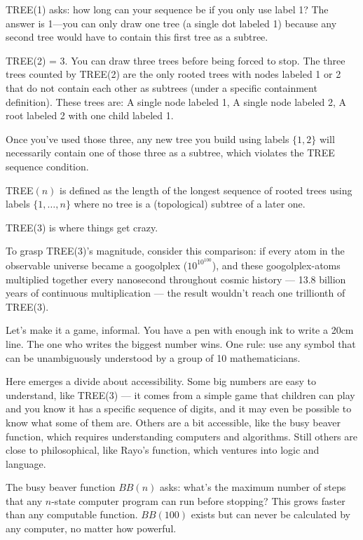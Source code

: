 TREE(1) asks: how long can your sequence be if you only use label 1? The answer is 1—you can only draw one tree (a single dot labeled 1) because any second tree would have to contain this first tree as a subtree.

TREE(2) = 3. You can draw three trees before being forced to stop. The three trees counted by TREE(2) are the only rooted trees with nodes labeled 1 or 2 that do not contain each other as subtrees (under a specific containment definition). These trees are: A single node labeled 1, A single node labeled 2, A root labeled 2 with one child labeled 1.

Once you've used those three, any new tree you build using labels $\{1, 2\}$ will necessarily contain one of those three as a subtree, which violates the TREE sequence condition.

TREE$(n)$ is defined as the length of the longest sequence of rooted trees using labels $\{1,\ldots,n\}$ where no tree is a (topological) subtree of a later one.

TREE(3) is where things get crazy.

To grasp TREE(3)'s magnitude, consider this comparison: if every atom in the observable universe became a googolplex ($10^{10^{100}}$), and these googolplex-atoms multiplied together every nanosecond throughout cosmic history — 13.8 billion years of continuous multiplication — the result wouldn't reach one trillionth of TREE(3).

Let's make it a game, informal. You have a pen with enough ink to write a 20cm line. The one who writes the biggest number wins. One rule: use any symbol that can be unambiguously understood by a group of 10 mathematicians.

Here emerges a divide about accessibility. Some big numbers are easy to understand, like TREE(3) — it comes from a simple game that children can play and you know it has a specific sequence of digits, and it may even be possible to know what some of them are. Others are a bit accessible, like the busy beaver function, which requires understanding computers and algorithms. Still others are close to philosophical, like Rayo's function, which ventures into logic and language.

The busy beaver function $BB(n)$ asks: what's the maximum number of steps that any $n$-state computer program can run before stopping? This grows faster than any computable function. $BB(100)$ exists but can never be calculated by any computer, no matter how powerful.

